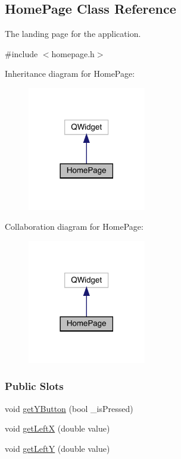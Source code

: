 \hypertarget{classHomePage}{}\subsection{Home\+Page Class Reference}
\label{classHomePage}


The landing page for the application.  




{\ttfamily \#include $<$homepage.\+h$>$}



Inheritance diagram for Home\+Page\+:\nopagebreak
\begin{figure}[H]
\begin{center}
\leavevmode
\includegraphics[width=146pt]{classHomePage__inherit__graph}
\end{center}
\end{figure}


Collaboration diagram for Home\+Page\+:\nopagebreak
\begin{figure}[H]
\begin{center}
\leavevmode
\includegraphics[width=146pt]{classHomePage__coll__graph}
\end{center}
\end{figure}
\subsubsection*{Public Slots}
\textbf{ }\par
\begin{DoxyCompactItemize}
\item 
void \mbox{\hyperlink{classHomePage_a8b38e0816ef5b863f13de62848a79d1e}{get\+Y\+Button}} (bool \+\_\+is\+Pressed)
\item 
void \mbox{\hyperlink{classHomePage_a63840fcd32af69c7d788ac93f6def734}{get\+LeftX}} (double value)
\item 
void \mbox{\hyperlink{classHomePage_a38c909855e6b1e1a0739642949aa4f9a}{get\+LeftY}} (double value)
\end{DoxyCompactItemize}

